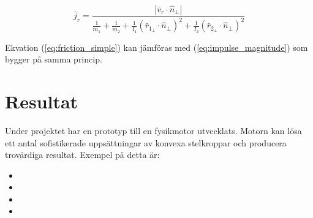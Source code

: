 \documentclass[a4paper,12pt,twopage,swedish]{article}
\begin{document}
\begin{equation}\label{eq:friction_simple}
\bar{j}_r = \frac{|\bar{v}_r \cdot \hat{n}_{\perp}|}{\frac{1}{m_1}+\frac{1}{m_2}+\frac{1}{I_1}(\bar{r}_{1_{\perp}} \cdot \hat{n}_{\perp})^2+\frac{1}{I_2}(\bar{r}_{2_{\perp}} \cdot \hat{n}_{\perp})^2}
\end{equation}

Ekvation (\ref{eq:friction_simple}) kan jämföras med (\ref{eq:impulse_magnitude}) som bygger på samma princip.




\section{Resultat}
Under projektet har en prototyp till en fysikmotor utvecklats. Motorn kan lösa ett antal sofistikerade uppsättningar av konvexa stelkroppar och producera trovärdiga resultat. 
Exempel på detta är:

\begin{itemize}
\item {}
\item {}
\item {}
\item {}
\end{itemize}
\end{document}
